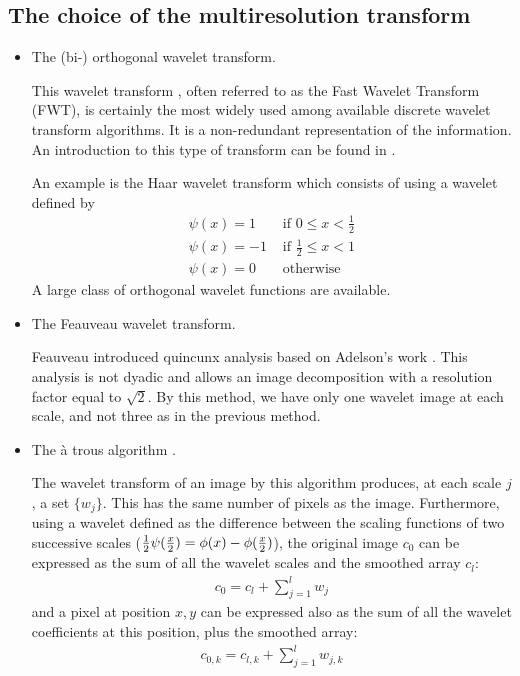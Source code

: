 \subsection{The choice of the multiresolution transform}
\begin{itemize}

\item The (bi-) orthogonal wavelet transform.

This wavelet transform \cite{wave:mallat89}, often referred to 
as the Fast Wavelet Transform (FWT),
is certainly the most widely used among available 
discrete wavelet transform algorithms. 
It is a non-redundant representation of the information. 
An introduction to this type of transform can be found in \cite{wave:strang96,wave:daube92}.

An example is the Haar wavelet transform which consists of using a 
wavelet defined by
\[\begin{array}{ll}
\psi(x)  = 1               & \mbox{ if } 0 \leq x < \frac{1}{2} \\
\psi(x) = -1               & \mbox{ if } \frac{1}{2} \leq x < 1 \\
\psi(x) = 0                & \mbox{ otherwise}
\end{array}\]
A large class of orthogonal wavelet functions are available.

\item The Feauveau wavelet transform.

Feauveau \cite{wave:feauveau} introduced quincunx analysis based on
 Adelson's work \cite{wave:adelson87}.
 This analysis is not dyadic and 
allows an image decomposition with a resolution factor equal to $\sqrt 2$. 
By this method, we have only one wavelet image at each scale, and not three
as in the previous method.

\item The \`a trous algorithm \cite{wave:hol89}.
 
The wavelet transform of an image by this algorithm
produces, at each scale $j$, a set $\{w_j\}$.  This has 
the same number of pixels as the image. Furthermore, using
a wavelet defined as the difference between the scaling functions
of two successive scales 
(${1 \over 2} \psi({x \over 2}) = \phi(x) - \phi({x \over 2})$),
the original image
$c_0$ can be expressed as the sum of all the wavelet scales and the
 smoothed array $c_{l}$:
\begin{eqnarray}
c_0 = c_{l} + \sum_{j=1}^{l} w_j
\end{eqnarray}
and a pixel at position $x,y$ can be expressed also as the sum of all the 
wavelet coefficients at this position, plus the smoothed array:
\begin{eqnarray}
c_{0,k} = c_{l,k} + \sum_{j=1}^{l} w_{j,k}
\end{eqnarray}


\end{itemize}
